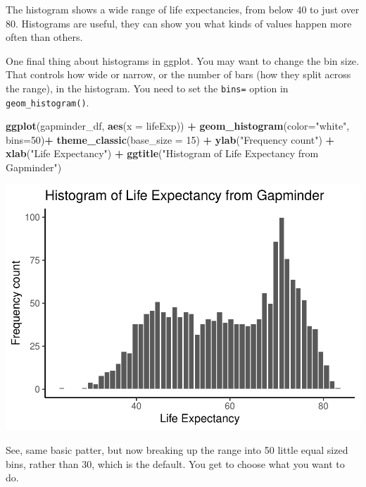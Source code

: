 \documentclass[]{book}
\newenvironment{Shaded}{\begin{snugshade}}{\end{snugshade}}
\newcommand{\KeywordTok}[1]{\textcolor[rgb]{0.13,0.29,0.53}{\textbf{#1}}}
\newcommand{\DataTypeTok}[1]{\textcolor[rgb]{0.13,0.29,0.53}{#1}}
\newcommand{\DecValTok}[1]{\textcolor[rgb]{0.00,0.00,0.81}{#1}}
\newcommand{\StringTok}[1]{\textcolor[rgb]{0.31,0.60,0.02}{#1}}
\newcommand{\OperatorTok}[1]{\textcolor[rgb]{0.81,0.36,0.00}{\textbf{#1}}}
\newcommand{\NormalTok}[1]{#1}
\begin{document}
The histogram shows a wide range of life expectancies, from below 40 to
just over 80. Histograms are useful, they can show you what kinds of
values happen more often than others.

One final thing about histograms in ggplot. You may want to change the
bin size. That controls how wide or narrow, or the number of bars (how
they split across the range), in the histogram. You need to set the
\texttt{bins=} option in \texttt{geom\_histogram()}.

\begin{Shaded}
\begin{Highlighting}[]
\KeywordTok{ggplot}\NormalTok{(gapminder_df, }\KeywordTok{aes}\NormalTok{(}\DataTypeTok{x =}\NormalTok{ lifeExp)) }\OperatorTok{+}
\StringTok{  }\KeywordTok{geom_histogram}\NormalTok{(}\DataTypeTok{color=}\StringTok{"white"}\NormalTok{, }\DataTypeTok{bins=}\DecValTok{50}\NormalTok{)}\OperatorTok{+}\StringTok{ }
\StringTok{  }\KeywordTok{theme_classic}\NormalTok{(}\DataTypeTok{base_size =} \DecValTok{15}\NormalTok{) }\OperatorTok{+}
\StringTok{  }\KeywordTok{ylab}\NormalTok{(}\StringTok{"Frequency count"}\NormalTok{) }\OperatorTok{+}\StringTok{ }
\StringTok{  }\KeywordTok{xlab}\NormalTok{(}\StringTok{"Life Expectancy"}\NormalTok{) }\OperatorTok{+}
\StringTok{  }\KeywordTok{ggtitle}\NormalTok{(}\StringTok{"Histogram of Life Expectancy from Gapminder"}\NormalTok{)}
\end{Highlighting}
\end{Shaded}

\includegraphics{Statistics_Lab_files/figure-latex/1gapminderC-1.pdf}

See, same basic patter, but now breaking up the range into 50 little
equal sized bins, rather than 30, which is the default. You get to
choose what you want to do.
\end{document}
